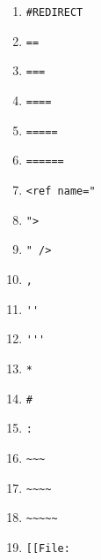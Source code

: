 \documentclass[a4paper,11pt]{article}
\begin{document}
\begin{center}
\begin{enumerate}
\item	\begin{verbatim}#REDIRECT\end{verbatim} 
\item	\begin{verbatim}==\end{verbatim} 
\item	\begin{verbatim}===\end{verbatim} 
\item	\begin{verbatim}====\end{verbatim} 
\item	\begin{verbatim}=====\end{verbatim} 
\item	\begin{verbatim}======\end{verbatim} 
\item	\begin{verbatim}<ref name="\end{verbatim} 
\item	\begin{verbatim}">\end{verbatim} 
\item	\begin{verbatim}" />\end{verbatim} 
\item	\begin{verbatim},\end{verbatim} 
\item	\begin{verbatim}''\end{verbatim} 
\item	\begin{verbatim}'''\end{verbatim} 
\item	\begin{verbatim}*\end{verbatim} 
\item	\begin{verbatim}#\end{verbatim} 
\item	\begin{verbatim}:\end{verbatim} 
\item	\begin{verbatim}~~~\end{verbatim} 
\item	\begin{verbatim}~~~~\end{verbatim} 
\item	\begin{verbatim}~~~~~\end{verbatim} 
\item	\begin{verbatim}[[File:\end{verbatim}
\end{enumerate}
\end{center}
\end{document}
